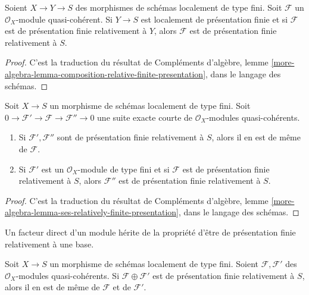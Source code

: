 \begin{lemma}
\label{lemma-composition-relative-finite-presentation}
Soient $X \to Y \to S$ des morphismes de schémas localement de type
fini. Soit $\mathcal{F}$ un $\mathcal{O}_X$-module quasi-cohérent.
Si $Y \to S$ est localement de présentation finie et si $\mathcal{F}$
est de présentation finie relativement à $Y$, alors $\mathcal{F}$
est de présentation finie relativement à $S$.
\end{lemma}

\begin{proof}
C'est la traduction du résultat de
Compléments d'algèbre, lemme
\ref{more-algebra-lemma-composition-relative-finite-presentation},
dans le langage des schémas.
\end{proof}

\begin{lemma}
\label{lemma-ses-relatively-finite-presentation}
Soit $X \to S$ un morphisme de schémas localement de type fini.
Soit $0 \to \mathcal{F}' \to \mathcal{F} \to \mathcal{F}'' \to 0$
une suite exacte courte de $\mathcal{O}_X$-modules quasi-cohérents.
\begin{enumerate}
\item Si $\mathcal{F}', \mathcal{F}''$ sont de présentation finie relativement à
$S$, alors il en est de même de $\mathcal{F}$.
\item Si $\mathcal{F}'$ est un $\mathcal{O}_X$-module de type fini
et si $\mathcal{F}$ est de présentation finie relativement à $S$, alors
$\mathcal{F}''$ est de présentation finie relativement à $S$.
\end{enumerate}
\end{lemma}

\begin{proof}
C'est la traduction du résultat de
Compléments d'algèbre, lemme
\ref{more-algebra-lemma-ses-relatively-finite-presentation},
dans le langage des schémas.
\end{proof}

\begin{lemma}
\label{lemma-sum-relatively-finite-presentation}
\begin{slogan}
Un facteur direct d'un module hérite de la propriété d'être de présentation
finie relativement à une base.
\end{slogan}
Soit $X \to S$ un morphisme de schémas localement de type fini.
Soient $\mathcal{F}, \mathcal{F}'$ des $\mathcal{O}_X$-modules quasi-cohérents.
Si $\mathcal{F} \oplus \mathcal{F}'$ est de présentation finie relativement à $S$,
alors il en est de même de $\mathcal{F}$ et de $\mathcal{F}'$.
\end{lemma}

